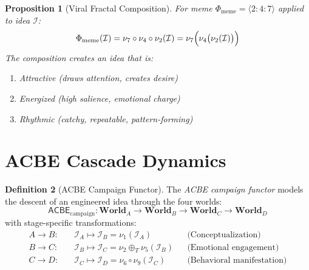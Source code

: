 \documentclass[11pt,twoside]{book}
\theoremstyle{definition}
\newtheorem{definition}{Definition}[chapter]
\theoremstyle{plain}
\newtheorem{proposition}[definition]{Proposition}
\theoremstyle{remark}
\newcommand{\noe}[1]{\nu_{#1}}
\newcommand{\Frac}{\Phi}
\newcommand{\ACBE}{\mathsf{ACBE}}
\newcommand{\Tadd}{\oplus_T}
\begin{document}
\begin{proposition}[Viral Fractal Composition]
\label{prop:viral-composition}
For meme $\Frac_{\mathrm{meme}} = \langle 2:4:7 \rangle$ applied to idea $\mathcal{I}$:
\[
    \Frac_{\mathrm{meme}}(\mathcal{I}) = \noe{7} \circ \noe{4} \circ \noe{2}(\mathcal{I})
    = \noe{7}\Bigl( \noe{4}\bigl( \noe{2}(\mathcal{I}) \bigr) \Bigr)
\]
The composition creates an idea that is:
\begin{enumerate}
    \item Attractive (draws attention, creates desire)
    \item Energized (high salience, emotional charge)
    \item Rhythmic (catchy, repeatable, pattern-forming)
\end{enumerate}
\end{proposition}

\section{ACBE Cascade Dynamics}

\begin{definition}[ACBE Campaign Functor]
\label{def:acbe-campaign}
The \emph{ACBE campaign functor} models the descent of an engineered idea through the four worlds:
\[
    \ACBE_{\mathrm{campaign}} : \mathbf{World}_A \to \mathbf{World}_B \to \mathbf{World}_C \to \mathbf{World}_D
\]
with stage-specific transformations:
\begin{align*}
    A \to B: &\quad \mathcal{I}_A \mapsto \mathcal{I}_B = \noe{1}(\mathcal{I}_A)
    && \text{(Conceptualization)} \\
    B \to C: &\quad \mathcal{I}_B \mapsto \mathcal{I}_C = \noe{2} \Tadd \noe{5}(\mathcal{I}_B)
    && \text{(Emotional engagement)} \\
    C \to D: &\quad \mathcal{I}_C \mapsto \mathcal{I}_D = \noe{6} \circ \noe{9}(\mathcal{I}_C)
    && \text{(Behavioral manifestation)}
\end{align*}
\end{definition}
\end{document}
